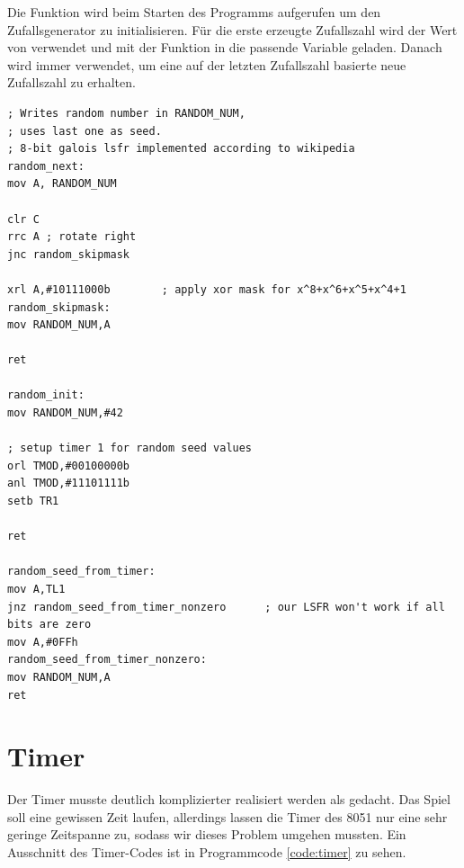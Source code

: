Die Funktion  wird beim Starten des Programms aufgerufen um den Zufallsgenerator zu initialisieren. Für die erste erzeugte Zufallszahl wird der Wert von  verwendet und mit der Funktion  in die passende Variable geladen. Danach wird immer  verwendet, um eine auf der letzten Zufallszahl basierte neue Zufallszahl zu erhalten.

\noindent
\begin{minipage}[t]{\textwidth}
	\vspace{1em}
	\begin{lstlisting}[caption=Quellcode für die Zufallszahlen-Generierung, label=code:random]
; Writes random number in RANDOM_NUM,
; uses last one as seed.
; 8-bit galois lsfr implemented according to wikipedia
random_next:
mov A, RANDOM_NUM

clr C
rrc A ; rotate right
jnc random_skipmask

xrl A,#10111000b		; apply xor mask for x^8+x^6+x^5+x^4+1
random_skipmask:
mov RANDOM_NUM,A

ret

random_init:
mov RANDOM_NUM,#42

; setup timer 1 for random seed values
orl TMOD,#00100000b
anl TMOD,#11101111b
setb TR1

ret

random_seed_from_timer:
mov A,TL1
jnz random_seed_from_timer_nonzero		; our LSFR won't work if all bits are zero
mov A,#0FFh
random_seed_from_timer_nonzero:
mov RANDOM_NUM,A
ret
	\end{lstlisting}
\end{minipage}

\section{Timer}

Der Timer musste deutlich komplizierter realisiert werden als gedacht. Das Spiel soll eine gewissen Zeit laufen, allerdings lassen die Timer des 8051 nur eine sehr geringe Zeitspanne zu, sodass wir dieses Problem umgehen mussten. Ein Ausschnitt des Timer-Codes ist in Programmcode \ref{code:timer} zu sehen. 

